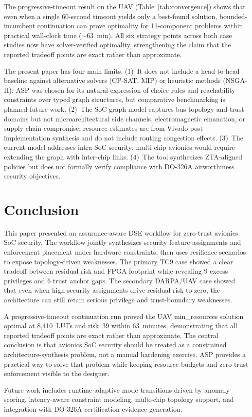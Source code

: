 \documentclass[conference]{IEEEtran}
\begin{document}
The progressive-timeout result on the UAV (Table~\ref{tab:convergence})
shows that even when a single 60-second timeout yields only a best-found
solution, bounded-incumbent continuation can prove optimality for
11-component problems within practical wall-clock time ($\sim$63~min).
All six strategy points across both case studies now have solver-verified
optimality, strengthening the claim that the reported tradeoff points are
exact rather than approximate.

The present paper has four main limits. (1)~It does not include a
head-to-head baseline against alternative solvers (CP-SAT, MIP) or
heuristic methods (NSGA-II); ASP was chosen for its natural expression of
choice rules and reachability constraints over typed graph structures, but
comparative benchmarking is planned future work. (2)~The SoC graph model
captures bus topology and trust domains but not microarchitectural side
channels, electromagnetic emanation, or supply chain compromise; resource
estimates are from Vivado post-implementation synthesis and do not include
routing congestion effects. (3)~The current model addresses intra-SoC
security; multi-chip avionics would require extending the graph with
inter-chip links. (4)~The tool synthesizes ZTA-aligned policies but does
not formally verify compliance with DO-326A airworthiness security
objectives.

\section{Conclusion}

This paper presented an assurance-aware DSE workflow for zero-trust
avionics SoC security. The workflow jointly synthesizes security feature
assignments and enforcement placement under hardware constraints, then uses
resilience scenarios to expose topology-driven weaknesses. The primary TC9
case showed a clear tradeoff between residual risk and FPGA footprint while
revealing 9 excess privileges and 6 trust anchor gaps. The secondary
DARPA/UAV case showed that even when high-security assignments drive
residual risk to zero, the architecture can still retain serious privilege
and trust-boundary weaknesses.

A progressive-timeout continuation run proved the UAV min\_resources
solution optimal at 8,410~LUTs and risk~39 within 63~minutes, demonstrating
that all reported tradeoff points are exact rather than approximate.
The central conclusion is that avionics SoC security should be treated as a
constrained architecture-synthesis problem, not a manual hardening exercise.
ASP provides a practical way to solve that problem while keeping resource
budgets and zero-trust enforcement visible to the designer.

Future work includes runtime-adaptive mode transitions driven by anomaly
scoring, latency-aware constraint modeling, multi-chip topology support,
and integration with DO-326A certification evidence generation.

\balance


\end{document}
